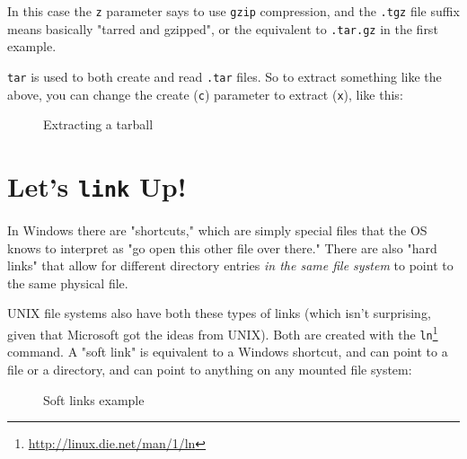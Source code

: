\documentclass[10pt,american,]{book}
\makeatletter
\newenvironment{Shaded}{\begin{snugshade}}{\end{snugshade}}
\newcommand{\KeywordTok}[1]{\textcolor[rgb]{0.13,0.29,0.53}{\textbf{{#1}}}}
\newcommand{\NormalTok}[1]{{#1}}
\renewcommand{\href}[2]{#2\footnote{\url{#1}}}
\numberwithin{figure}{chapter}
\DeclareRobustCommand{\drcap}[1]{\begin{figure}[H]\caption{#1}\end{figure}}
\DeclareRobustCommand{\drcmd}[1]{\index{Commands!#1@\texttt{#1}}}
\renewcommand{\KeywordTok}[1]{{#1}}
\renewcommand{\NormalTok}[1]{{#1}}
\makeatother
\begin{document}
In this case the \texttt{z} parameter says to use \texttt{gzip}
compression, and the \texttt{.tgz} file suffix means basically "tarred
and gzipped", or the equivalent to \texttt{.tar.gz} in the first
example.

\texttt{tar} is used to both create and read \texttt{.tar} files. So to
extract something like the above, you can change the create (\texttt{c})
parameter to extract (\texttt{x}), like this:

\drcap{Extracting a tarball}

\begin{Shaded}
\end{Shaded}

\section*{\texorpdfstring{Let's \texttt{link}
Up!}{Let's link Up!}}\label{lets-link-up}

In Windows there are "shortcuts," which are simply special files that
the OS knows to interpret as "go open this other file over there." There
are also "hard links" that allow for different directory entries
\emph{in the same file system} to point to the same physical file.

UNIX file systems also have both these types of links (which isn't
surprising, given that Microsoft got the ideas from UNIX). Both are
created with the
\href{http://linux.die.net/man/1/ln}{\texttt{ln}}\drcmd{ln} command. A
"soft link" is equivalent to a Windows shortcut, and
can point to a file or a directory, and can point to anything on any
mounted file system:

\drcap{Soft links example}
\end{document}
